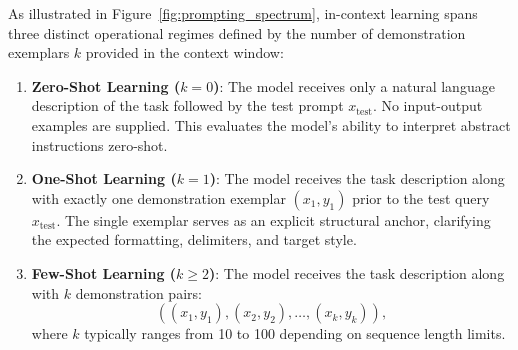 \documentclass[../../../main.tex]{subfiles}
\begin{document}
As illustrated in Figure~\ref{fig:prompting_spectrum}, in-context learning spans three distinct operational regimes defined by the number of demonstration exemplars $k$ provided in the context window:
\begin{enumerate}
    \item \textbf{Zero-Shot Learning ($k = 0$)}: The model receives only a natural language description of the task followed by the test prompt $x_{\text{test}}$. No input-output examples are supplied. This evaluates the model's ability to interpret abstract instructions zero-shot.
    
    \item \textbf{One-Shot Learning ($k = 1$)}: The model receives the task description along with exactly one demonstration exemplar $(x_1, y_1)$ prior to the test query $x_{\text{test}}$. The single exemplar serves as an explicit structural anchor, clarifying the expected formatting, delimiters, and target style.
    
    \item \textbf{Few-Shot Learning ($k \ge 2$)}: The model receives the task description along with $k$ demonstration pairs:
    \begin{equation*}
    ((x_1, y_1), (x_2, y_2), \dots, (x_k, y_k)),
    \end{equation*}
    where $k$ typically ranges from 10 to 100 depending on sequence length limits.
\end{enumerate}
\end{document}
